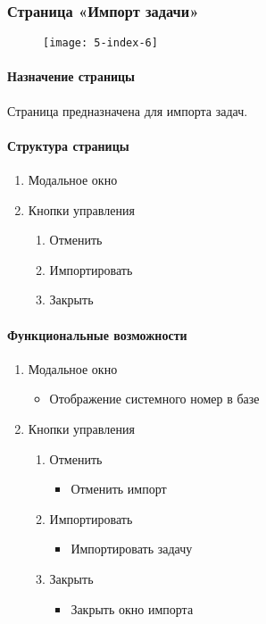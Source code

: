 \subsubsection{Страница «Импорт задачи»}
\begin{figure}[H]
\texttt{[image: 5-index-6]}
\end{figure}
\paragraph{Назначение страницы}
Страница предназначена для импорта задач.

\paragraph{Структура страницы}
\begin{enumerate}
	\item Модальное окно
	\item Кнопки управления
	\begin{enumerate}
		\item Отменить
		\item Импортировать
		\item Закрыть
	\end{enumerate}
\end{enumerate}

\paragraph{Функциональные возможности}
\begin{enumerate}
	\item Модальное окно
	\begin{itemize}
		\item Отображение системного номер в базе
	\end{itemize}
	\item Кнопки управления
	\begin{enumerate}
		\item Отменить
		\begin{itemize}
			\item Отменить импорт
		\end{itemize}

		\item Импортировать
		\begin{itemize}
			\item Импортировать задачу
		\end{itemize}

		\item Закрыть
		\begin{itemize}
			\item Закрыть окно импорта
		\end{itemize}
	\end{enumerate}
\end{enumerate}


